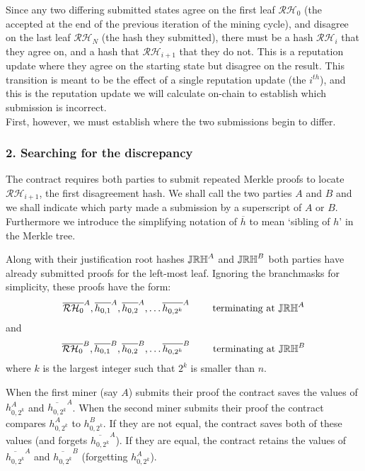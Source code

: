 Since any two differing submitted states agree on the first leaf $\mathcal{RH}_0$ (the  accepted at the end of the previous iteration of the mining cycle), and disagree on the last leaf $\mathcal{RH}_N$ (the hash they submitted), there must be a hash $\mathcal{RH}_i$ that they agree on, and a hash that $\mathcal{RH}_{i+1}$ that they do not. This is a reputation update where they agree on the starting state but disagree on the result. This transition is meant to be the effect of a single reputation update (the $i^{th}$), and this is the reputation update we will calculate on-chain to establish which submission is incorrect.\\

\noindent First, however, we must establish where the two submissions begin to differ.

\subsubsection*{2. Searching for the discrepancy}
The contract requires both parties to submit repeated Merkle proofs to locate $\mathcal{RH}_{i+1}$, the first disagreement hash. We shall call the two parties $A$ and $B$ and we shall indicate which party made a submission by a superscript of $A$ or $B$. Furthermore we introduce the simplifying notation of $\overline{h}$ to mean `sibling of $h$' in the Merkle tree.

Along with their justification root hashes $\mathbb{JRH}^A$ and $\mathbb{JRH}^B$ both parties have already submitted proofs for the left-most leaf. Ignoring the branchmasks for simplicity, these proofs have the form:
\[
 \overline{\mathcal{RH}_0}^A, \overline{h_{0,1}}^A, \overline{h_{0,2}}^A, \ldots \overline{h_{0,2^k}}^A \qquad \textnormal{ terminating at } \mathbb{JRH}^A
\]
and
\[
 \overline{\mathcal{RH}_0}^B, \overline{h_{0,1}}^B, \overline{h_{0,2}}^B, \ldots \overline{h_{0,2^k}}^B \qquad \textnormal{ terminating at } \mathbb{JRH}^B
\]
where $k$ is the largest integer such that $2^k$ is smaller than $n$.

When the first miner (say $A$) submits their proof the contract saves the values of $h_{0,2^k}^A$ and $\overline{h_{0,2^k}}^A$. When the second miner submits their proof the contract compares $h_{0,2^k}^A$ to $h_{0,2^k}^B$. If they are not equal, the contract saves both of these values (and forgets $\overline{h_{0,2^k}}^A$). If they are equal, the contract retains the values of $\overline{h_{0,2^k}}^A$ and $\overline{h_{0,2^k}}^B$ (forgetting $h_{0,2^k}^A$).

